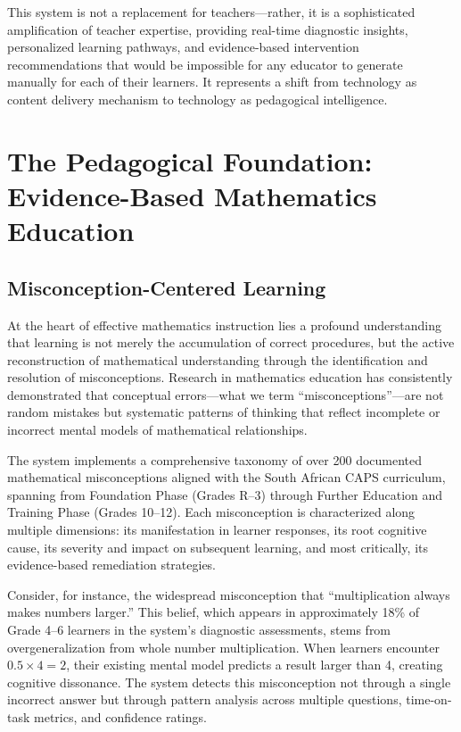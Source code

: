 \documentclass[12pt,a4paper]{article}
\begin{document}
This system is not a replacement for teachers---rather, it is a sophisticated amplification of teacher expertise, providing real-time diagnostic insights, personalized learning pathways, and evidence-based intervention recommendations that would be impossible for any educator to generate manually for each of their learners. It represents a shift from technology as content delivery mechanism to technology as pedagogical intelligence.

\section{The Pedagogical Foundation: Evidence-Based Mathematics Education}

\subsection{Misconception-Centered Learning}

At the heart of effective mathematics instruction lies a profound understanding that learning is not merely the accumulation of correct procedures, but the active reconstruction of mathematical understanding through the identification and resolution of misconceptions. Research in mathematics education has consistently demonstrated that conceptual errors---what we term ``misconceptions''---are not random mistakes but systematic patterns of thinking that reflect incomplete or incorrect mental models of mathematical relationships.

The system implements a comprehensive taxonomy of over 200 documented mathematical misconceptions aligned with the South African CAPS curriculum, spanning from Foundation Phase (Grades R--3) through Further Education and Training Phase (Grades 10--12). Each misconception is characterized along multiple dimensions: its manifestation in learner responses, its root cognitive cause, its severity and impact on subsequent learning, and most critically, its evidence-based remediation strategies.

Consider, for instance, the widespread misconception that ``multiplication always makes numbers larger.'' This belief, which appears in approximately 18\% of Grade 4--6 learners in the system's diagnostic assessments, stems from overgeneralization from whole number multiplication. When learners encounter $0.5 \times 4 = 2$, their existing mental model predicts a result larger than 4, creating cognitive dissonance. The system detects this misconception not through a single incorrect answer but through pattern analysis across multiple questions, time-on-task metrics, and confidence ratings.
\end{document}
